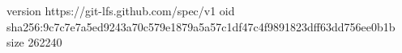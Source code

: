 version https://git-lfs.github.com/spec/v1
oid sha256:9c7c7e7a5ed9243a70c579e1879a5a57c1df47c4f9891823dff63dd756ee0b1b
size 262240
